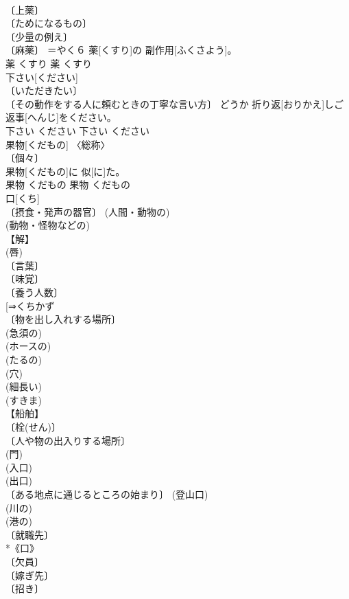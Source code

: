 \documentclass[8pt]{extreport}
\begin{document}
\begin{CJK}{UTF8}{min}
\\	〔上薬〕 
\\	〔ためになるもの〕 
\\	〔少量の例え〕 
\\	〔麻薬〕 ＝やく６	薬[くすり]の 副作用[ふくさよう]。	
\\	薬	くすり	薬	くすり	
\\	下さい[ください]	
\\	〔いただきたい〕 
\\	〔その動作をする人に頼むときの丁寧な言い方〕	どうか 折り返[おりかえ]しご 返事[へんじ]をください。	
\\	下さい	ください	下さい	ください	
\\	果物[くだもの]	〈総称〉 
\\	〔個々〕 
\\	果物[くだもの]に 似[に]た。	
\\	果物	くだもの	果物	くだもの	
\\	口[くち]	
\\	〔摂食・発声の器官〕 (人間・動物の) 
\\	(動物・怪物などの) 
\\	【解】 
\\	(唇) 
\\	〔言葉〕 
\\	〔味覚〕 
\\	〔養う人数〕 
\\	[⇒くちかず 
\\	〔物を出し入れする場所〕 
\\	(急須の) 
\\	(ホースの) 
\\	(たるの) 
\\	(穴) 
\\	(細長い) 
\\	(すきま) 
\\	【船舶】 
\\	〔栓(せん)〕 
\\	〔人や物の出入りする場所〕 
\\	(門) 
\\	(入口) 
\\	(出口) 
\\	〔ある地点に通じるところの始まり〕 (登山口) 
\\	(川の) 
\\	(港の) 
\\	〔就職先〕 
\\	*《口》 
\\	〔欠員〕 
\\	〔嫁ぎ先〕 
\\	〔招き〕 

\end{CJK}
\end{document}

